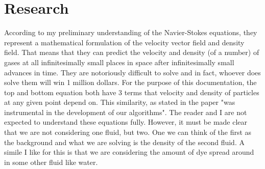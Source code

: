 \documentclass[12pt,a4paper]{book}
\begin{document}
\section{Research}
According to my preliminary understanding of the Navier-Stokes equations, they represent a mathematical formulation of the velocity vector field and density field. That means that they can predict the velocity and density (of a number) of gases at all infinitesimally small places in space after infinitesimally small advances in time. They are notoriously difficult to solve and in fact, whoever does solve them will win 1 million dollars. For the purpose of this documentation, the top and bottom equation both have 3 terms that velocity and density of particles at any given point depend on. This similarity, as stated in the paper "was instrumental in the development of our algorithms". The reader and I are not expected to understand these equations fully. However, it must be made clear that we are not considering one fluid, but two. One we can think of the first as the background and what we are solving is the density of the second fluid. A simile I like for this is that we are considering the amount of dye spread around in some other fluid like water.
\end{document}
